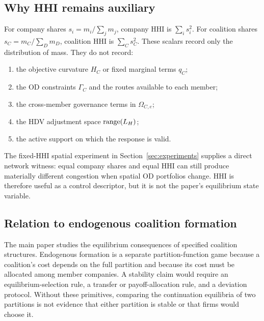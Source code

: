 \subsection{Why HHI remains auxiliary}

For company shares $s_i=m_i/\sum_jm_j$, company HHI is $\sum_i s_i^2$. For coalition shares $s_C=m_C/\sum_Dm_D$, coalition HHI is $\sum_Cs_C^2$. These scalars record only the distribution of mass. They do not record:
\begin{enumerate}
\item the objective curvature $H_C$ or fixed marginal terms $q_C$;
\item the OD constraints $\Gamma_C$ and the routes available to each member;
\item the cross-member governance terms in $\Omega_{C,e}$;
\item the HDV adjustment space $\operatorname{range}(L_H)$;
\item the active support on which the response is valid.
\end{enumerate}
The fixed-HHI spatial experiment in Section~\ref{sec:experiments} supplies a direct network witness: equal company shares and equal HHI can still produce materially different congestion when spatial OD portfolios change. HHI is therefore useful as a control descriptor, but it is not the paper's equilibrium state variable.

\subsection{Relation to endogenous coalition formation}

The main paper studies the equilibrium consequences of specified coalition structures. Endogenous formation is a separate partition-function game because a coalition's cost depends on the full partition and because its cost must be allocated among member companies. A stability claim would require an equilibrium-selection rule, a transfer or payoff-allocation rule, and a deviation protocol. Without these primitives, comparing the continuation equilibria of two partitions is not evidence that either partition is stable or that firms would choose it.
